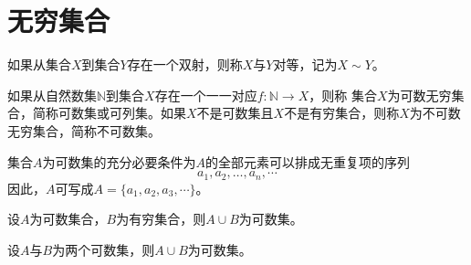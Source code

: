 \chapter{无穷集合}
  \begin{Def}
    如果从集合$X$到集合$Y$存在一个双射，则称$X$与$Y$对等，记为$X \sim Y$。
  \end{Def}
  \begin{Def}
    如果从自然数集$\mathbb{N}$到集合$X$存在一个一一对应$f:\mathbb{N}\to X$，则称
    集合$X$为可数无穷集合，简称可数集或可列集。如果$X$不是可数集且$X$不是有穷集合，则称$X$为不可数无穷集合，简称不可数集。
  \end{Def}
  \begin{Thm}
    集合$A$为可数集的充分必要条件为$A$的全部元素可以排成无重复项的序列
    \[a_1, a_2, \ldots, a_n, \cdots\]
    因此，$A$可写成$A = \{a_1, a_2, a_3, \cdots\}$。
  \end{Thm}
  \begin{Thm}
   设$A$为可数集合，$B$为有穷集合，则$A\cup B$为可数集。
  \end{Thm}
  \begin{Thm}
    设$A$与$B$为两个可数集，则$A\cup B$为可数集。
  \end{Thm}

